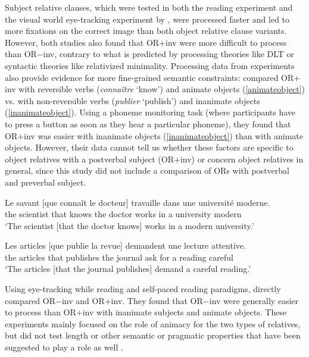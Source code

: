 \documentclass[output=paper]{langscibook}
\begin{document}
Subject relative clauses, which were tested in both the
\citet{Holmes1981} reading experiment and the visual world
eye-tracking experiment by \citet{pozniak2015processing}, were
processed faster and led to more fixations on the correct image than
both object relative clause variants. However, both studies also found
that OR$+$inv were more difficult to process than OR$-$inv, contrary to
what is predicted by processing theories like DLT or syntactic
theories like relativized minimality.  Processing data from
experiments also provide evidence for more fine-grained semantic
constraints: \citet{Frauenfelder1980} compared OR$+$inv with reversible
verbs (\textit{connaître} `know’) and animate objects
(\ref{animateobject}) vs. with non-reversible verbs
(\textit{publier} `publish’) and inanimate objects
(\ref{inanimateobject}). Using a phoneme monitoring task (where
participants have to press a button as soon as they hear a particular
phoneme), they found that OR$+$inv was easier with inanimate objects
(\ref{inanimateobject}) than with animate objects. However, their data
cannot tell us whether these factors are specific to object relatives
with a postverbal subject (OR$+$inv) or concern object relatives in
general, since this study did not include a comparison of ORs with
postverbal and preverbal subject.

\begin{exe}
\ex \label{animateobject}
\gll Le savant [que connaît le docteur] travaille dans une université moderne.\\   
 the scientist that knows the doctor works in a university modern \\
\glt `The scientist [that the doctor knows] works in a modern university.'

\ex \label{inanimateobject}
\gll Les articles [que publie la revue] demandent une lecture attentive.\\    
 the articles that publishes the journal {ask for} a reading careful\\
\glt `The articles [that the journal publishes] demand a careful reading.'
\end{exe}


Using eye-tracking while reading and self-paced reading paradigms,
\citet{baudiffier2011effect} directly compared OR$-$inv and OR$+$inv. They found that 
OR$-$inv were generally easier to process than OR$+$inv with inanimate subjects 
and animate objects.  These experiments mainly
focused on the role of animacy for the two types of relatives, but did
not test length or other semantic or pragmatic properties that have
been suggested to play a role as well \citep [e.g.][]{catherine1997}.
\end{document}
